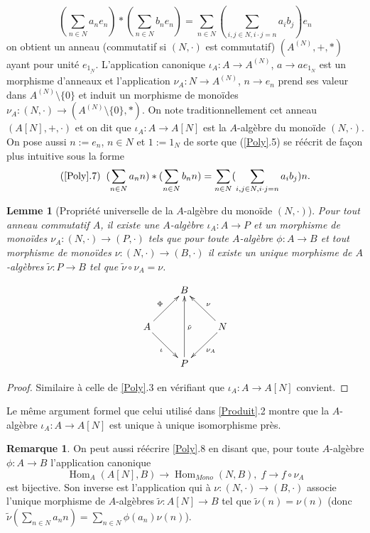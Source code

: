 \documentclass[a4paper, oneside, 12pt]{book}
\theoremstyle{theoremeStyle} %
\newtheorem{lemme}[theoreme]{Lemme}
\theoremstyle{definition} %
\newtheorem{remarque}[theoreme]{Remarque}
\DeclareMathOperator{\SHom}{Hom}
\begin{document}
	\begin{equation}(\sum_{n\in N}a_{n}e_{n}) *(\sum_{n\in N}b_{n}e_{n})=\sum_{n\in N}(\sum_{i,j\in N,i\cdot j=n}a_{i}b_{j})e_{n}\end{equation}
on obtient un anneau (commutatif si $(N,\cdot)$ est commutatif) $(A^{(N)},+,*)$  ayant pour unité $e_{\underline{1_N}}$. L'application canonique $\iota_A:A\rightarrow A^{(N)}$, $a\rightarrow ae_{1_N}  $  est un morphisme d'anneaux et l'application $\nu_A:N\rightarrow A^{(N)}$, $n\rightarrow e_n$ prend ses valeur dans $A^{(N)}\setminus\lbrace 0\rbrace$ et induit un morphisme de monoïdes $\nu_A:(N,\cdot)\rightarrow (A^{(N)}\setminus\lbrace 0\rbrace,*)$.
 On note traditionnellement cet anneau $(A[N],+,\cdot) $ et on dit que $\iota_A:A\rightarrow A[N]$ est la $A$-algèbre du monoïde $(N,\cdot)$. On pose aussi $n:=e_{n}$, $n\in N$    et $1:=1_N$ de sorte que (\ref{Poly}.5) se réécrit de façon plus intuitive sous la forme
 $$(\ref{Poly}.7)\;\; (\sum_{n\in N}a_{n}n) *(\sum_{n\in N}b_{n}n)=\sum_{n\in N}(\sum_{i,j\in N,i\cdot j=n}a_{i}b_{j})n.$$

 \begin{lemme}[Propriété universelle de la $A$-algèbre du monoïde $(N,\cdot)$]Pour tout anneau commutatif $A$, il existe une $A$-algèbre $\iota_A: A\rightarrow P$ et un  morphisme de monoïdes $\nu_A:(N,\cdot)\rightarrow (P  ,\cdot)$ tels que pour toute $A$-algèbre   $\phi: A\rightarrow B$ et tout morphisme de monoïdes $\nu:(N,\cdot)\rightarrow (B  ,\cdot)$  il existe un unique  morphisme de $A$-algèbres $\tilde{\nu}:P\rightarrow B$  tel que $ \tilde{\nu}\circ \nu_A=\nu$.\end{lemme}

	$$ \xymatrix{ & B \\ A \ar[ru]^\Phi \ar[rd]_\iota & & N \ar[lu]_\nu \ar[ld]^{\nu_A} \\ & P \ar[uu]_{\tilde{\nu} } } $$

\begin{proof} Similaire à celle de \ref{Poly}.3 en vérifiant que $\iota_A:A\rightarrow A[N]$ convient. \end{proof}

  Le même argument  formel que celui utilisé dans \ref{Produit}.2 montre que la $A$-algèbre $\iota_A: A\rightarrow A[N]$ est unique à unique isomorphisme  près.\\

\begin{remarque}On peut aussi réécrire \ref{Poly}.8 en disant que, pour toute $A$-algèbre $\phi:A\rightarrow B$  l'application canonique
$$\SHom_A(A[N],B)\rightarrow\SHom_{Mono}(N,B),\; f\rightarrow f\circ\nu_A$$
est bijective. Son inverse est l'application qui à $\nu:(N,\cdot)\rightarrow (B,\cdot) $ associe l'unique morphisme de $A$-algèbres $ \tilde{\nu}:A[N]\rightarrow B$ tel que $ \tilde{\nu}(n)=\nu(n)$ (donc $\tilde{\nu}(\sum_{n\in N}a_nn)=\sum_{n\in N}\phi(a_n)\nu(n)$).\end{remarque}
\end{document}
